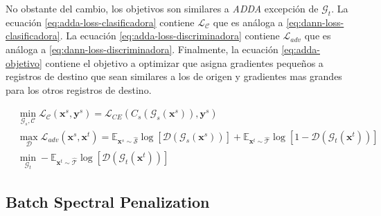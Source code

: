 No obstante del cambio, los objetivos son similares a {\it ADDA} excepción de $\mathcal{G}_t$. La ecuación
\ref{eq:adda-loss-clasificadora} contiene $\mathcal{L}_\mathcal{C}$ que es análoga a \ref{eq:dann-loss-clasificadora}.
La ecuación \ref{eq:adda-loss-discriminadora} contiene $\mathcal{L}_{adv}$ que es análoga a
\ref{eq:dann-loss-discriminadora}. Finalmente, la ecuación \ref{eq:adda-objetivo} contiene el objetivo a optimizar que
asigna gradientes pequeños a registros de destino que sean similares a los de origen y gradientes mas grandes para los
otros registros de destino.

\begin{align}
     & \min_{\mathcal{G}_s, \mathcal{C}} \mathcal{L}_\mathcal{C}(\mathbf{x}^s, \mathbf{y}^s)                                                            = \mathcal{L}_{CE}(C_s(\mathcal{G}_s(\mathbf{x}^s)), \mathbf{y}^s)
    \label{eq:adda-loss-clasificadora}                                                                                                                                                                                                                                                                                                                                                          \\
     & \max_{\mathcal{D}} \mathcal{L}_{adv}(\mathbf{x}^s, \mathbf{x}^t)                                                                                 = \mathbb{E}_{\mathbf{x}^s \sim \mathcal{\hat{S}}}\log[\mathcal{D}(\mathcal{G}_s(\mathbf{x}^s))] + \mathbb{E}_{\mathbf{x}^t \sim \mathcal{\hat{T}}}\log[1-\mathcal{D}(\mathcal{G}_t(\mathbf{x}^t))] \label{eq:adda-loss-discriminadora} \\
     & \min_{\mathcal{G}_t} - \mathbb{E}_{\mathbf{x}^t \sim \mathcal{\hat{T}}} \log[\mathcal{D}(\mathcal{G}_t(\mathbf{x}^t))]  \label{eq:adda-objetivo}
\end{align}

\subsection{Batch Spectral Penalization}

